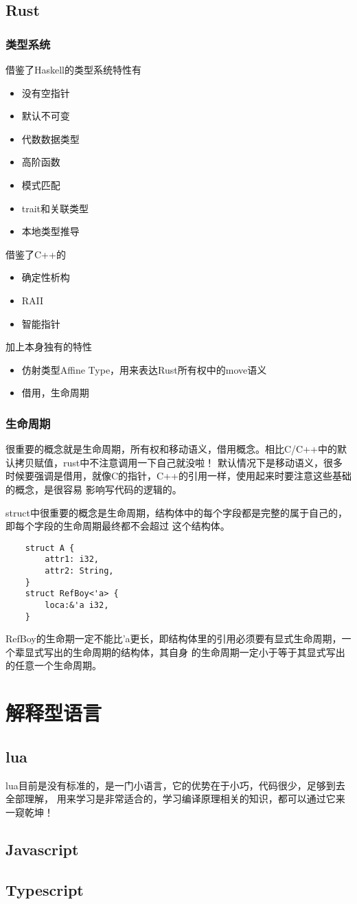 \subsection{Rust}

\subsubsection{类型系统}
借鉴了Haskell的类型系统特性有
\begin{itemize}
    \item {没有空指针}
    \item {默认不可变}
    \item {代数数据类型}
    \item {高阶函数}
    \item {模式匹配}
    \item {trait和关联类型}
    \item {本地类型推导}
\end{itemize}
借鉴了C++的
\begin{itemize}
    \item {确定性析构}
    \item {RAII}
    \item {智能指针}
\end{itemize}
加上本身独有的特性
\begin{itemize}
    \item {仿射类型Affine Type，用来表达Rust所有权中的move语义}
    \item {借用，生命周期}
\end{itemize}

\subsubsection{生命周期}
很重要的概念就是生命周期，所有权和移动语义，借用概念。相比C/C++中的默认拷贝赋值，rust中不注意调用一下自己就没啦！
默认情况下是移动语义，很多时候要强调是借用，就像C的指针，C++的引用一样，使用起来时要注意这些基础的概念，是很容易
影响写代码的逻辑的。

struct中很重要的概念是生命周期，结构体中的每个字段都是完整的属于自己的，即每个字段的生命周期最终都不会超过
这个结构体。
\begin{lstlisting}
    struct A {
        attr1: i32,
        attr2: String,
    }
    struct RefBoy<'a> {
        loca:&'a i32,
    }
\end{lstlisting}
RefBoy的生命期一定不能比'a更长，即结构体里的引用必须要有显式生命周期，一个辈显式写出的生命周期的结构体，其自身
的生命周期一定小于等于其显式写出的任意一个生命周期。

\section{解释型语言}

\subsection{lua}
lua目前是没有标准的，是一门小语言，它的优势在于小巧，代码很少，足够到去全部理解，
用来学习是非常适合的，学习编译原理相关的知识，都可以通过它来一窥乾坤！

\subsection{Javascript}

\subsection{Typescript}
